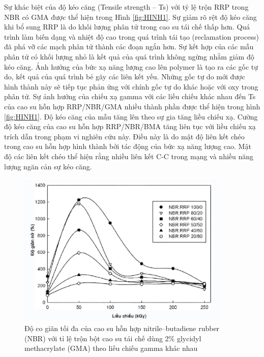 \documentclass[12pt,a4paper]{article}
\begin{document}
	
	Sự khác biệt của độ kéo căng (Tensile strength – Ts) với tỷ lệ trộn RRP trong NBR có GMA được thể hiện
trong Hình \ref{fig:HINH1}. Sự giảm rõ rệt độ kéo căng khi bổ sung RRP là do khối lượng phân tử trong cao su tái chế thấp hơn.
Quá trình làm biến dạng và nhiệt độ cao trong quá trình tái tạo (reclamation process) đã phá vỡ các mạch phân tử thành các đoạn ngắn hơn. Sự kết hợp của các mẫu phân tử có khối lượng nhỏ là kết quả của quá trình không ngừng nhằm giảm độ kéo căng. Ảnh hưởng của bức xạ năng lượng cao lên polymer là tạo ra các gốc tự do, kết quả của quá trình bẻ gãy các liên kết yếu. Những gốc tự do mới được hình thành này sẽ tiếp tục phản ứng với chính gốc tự do khác hoặc với oxy trong phân tử. Sự ảnh hưởng của chiếu xạ gamma với các liều chiếu khác nhau đến Ts của cao su hỗn hợp RRP/NBR/GMA nhiều thành phần được thể hiện trong hình \ref{fig:HINH1}. Độ kéo căng của mẫu tăng lên theo sự gia tăng liều chiếu xạ. Cường độ kéo căng của cao su hỗn hợp RRP/NBR/BMA tăng liên tục với liều chiếu xạ trích dẫn trong phạm vi nghiên cứu này. Điều này là do mật độ liên kết chéo trong cao su hỗn hợp hình thành bởi tác động của bức xạ năng lượng cao. Mật độ các liên kết chéo thể hiện rằng nhiều liên kết C-C trong mạng và nhiều năng lượng ngăn cản sự kéo căng.\\

	\begin{figure}
		\centering
		\includegraphics[width=0.9\textwidth]{4.JPG}
		\caption{Độ co giãn tối đa của cao su hỗn hợp nitrile–butadiene rubber (NBR) với tỉ lệ trộn bột cao su tái chế dùng 2\% glycidyl methacrylate (GMA) theo liếu chiếu gamma khác nhau}
		\label{fig:HINH2}		
	\end{figure}
	
\end{document}
